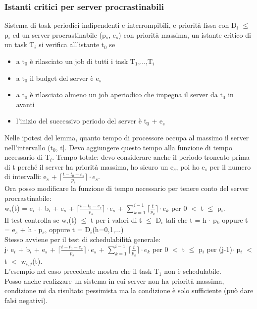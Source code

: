 \documentclass[12pt, oneside]{extbook}
\begin{document}
\subsubsection{Istanti critici per server procrastinabili}
Sistema di task periodici indipendenti e interrompibili, e priorità fissa con D$_{i}$ $\leq$ p$_{i}$ ed un server procrastinabile (p$_{s}$, e$_{s}$) con priorità massima, un istante critico di un task T$_{i}$ si verifica all'istante t$_{0}$ se 
\begin{itemize}
\item a t$_{0}$ è rilasciato un job di tutti i task T$_{1}$,...,T$_{i}$
\item a t$_{0}$ il budget del server è e$_{s}$
\item a t$_{0}$ è rilasciato almeno un job aperiodico che impegna il server da t$_{0}$ in avanti
\item l'inizio del successivo periodo del server è t$_{0}$ + e$_{s}$
\end{itemize}
Nelle ipotesi del lemma, quanto tempo di processore occupa al massimo il server nell'intervallo (t$_{0}$, t]. Devo aggiungere questo tempo alla funzione di tempo necessario di T$_{i}$. Tempo totale: devo considerare anche il periodo troncato prima di t perché il server ha priorità massima, ho sicuro un e$_{s}$, poi ho e$_{s}$ per il numero di intervalli:
e$_{s}$ + $\lceil \frac{t-t_{0}-e_{s}}{p_s}\rceil \cdot e_s$.\\ Ora posso modificare la funzione di tempo necessario per tenere conto del server procrastinabile:\\ 
w$_{i}$(t) = e$_{i}$ + b$_{i}$ + e$_{s}$ + $\lceil \frac{t-t_{0}-e_{s}}{p_s}\rceil \cdot e_s$ + $\sum\limits_{k = 1}^{i-1}\lceil \frac{t}{p_{k}}\rceil \cdot e_k$ per 0 $<$ t $\leq$ p$_{i}$.\\ Il test controlla se w$_{i}$(t) $\leq$ t per i valori di t $\leq$ D$_{i}$ tali che t = h $\cdot$ p$_{k}$ oppure t = e$_{s}$ +  h $\cdot$ p$_{s}$, oppure t = D$_{i}$(h=0,1,...)\\ Stesso avviene per il test di schedulabilità generale:\\ j$\cdot$ e$_{i}$ + b$_{i}$ + e$_{s}$ + $\lceil \frac{t-t_{0}-e_{s}}{p_s}\rceil \cdot e_s$ + $\sum\limits_{k = 1}^{i-1}\lceil \frac{t}{p_{k}}\rceil \cdot e_k$ per 0 $<$ t $\leq$ p$_{i}$ per (j-1)$\cdot$ p$_{i}$ $<$ t $<$ w$_{i,j}$(t).\\ L'esempio nel caso precedente mostra che il task T$_{1}$ non è schedulabile.\\ Posso anche realizzare un sistema in cui server non ha priorità massima, condizione mi da risultato pessimista ma la condizione è solo sufficiente (può dare falsi negativi).
\end{document}
